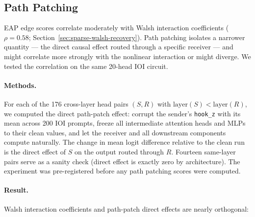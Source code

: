\documentclass{article}
\begin{document}
%
%

\subsection{Path Patching}
\label{sec:path-patching}

EAP edge scores correlate moderately with Walsh interaction coefficients
($\rho = 0.58$; Section~\ref{sec:sparse-walsh-recovery}). Path patching
isolates a narrower quantity --- the direct causal effect routed through a
specific receiver --- and might correlate more strongly with the
nonlinear interaction or might diverge. We tested the correlation on the same
20-head IOI circuit.

\paragraph{Methods.}

For each of the 176 cross-layer head pairs $(S, R)$ with
$\text{layer}(S) < \text{layer}(R)$, we computed the direct path-patch
effect: corrupt the sender's \texttt{hook\_z} with its mean across 200
IOI prompts, freeze all intermediate attention heads and MLPs to their
clean values, and let the receiver and all downstream components compute
naturally. The change in mean logit difference relative to the clean run
is the direct effect of $S$ on the output routed through $R$. Fourteen
same-layer pairs serve as a sanity check (direct effect is exactly zero
by architecture). The experiment was pre-registered before any path
patching scores were computed.

\paragraph{Result.}

Walsh interaction coefficients and path-patch direct effects are nearly
orthogonal:
\end{document}
